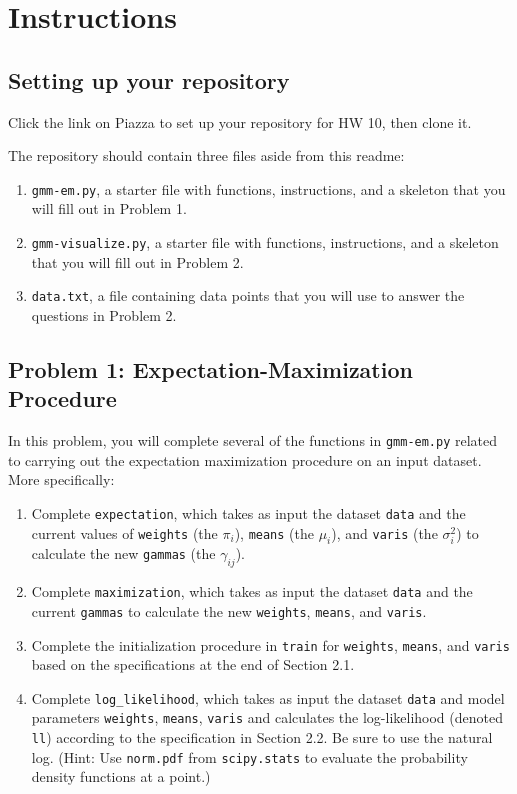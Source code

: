 \documentclass[10pt]{article}
\begin{document}
\section{Instructions}
\renewcommand{\thesubsection}{\thesection.\number\numexpr\value{subsection}-1\relax}

\subsection{Setting up your repository}
Click the link on Piazza to set up your repository for HW 10, then clone it.

The repository should contain three files aside from this readme:

\begin{enumerate}
\item {\tt gmm-em.py}, a starter file with functions, instructions, and a skeleton that you will fill out in Problem 1.
\item {\tt gmm-visualize.py}, a starter file with functions, instructions, and a skeleton that you will fill out in Problem 2.
\item {\tt data.txt}, a file containing data points that you will use to answer the questions in Problem 2.
\end{enumerate}



\subsection{Problem 1: Expectation-Maximization Procedure}
In this problem, you will complete several of the functions in {\tt gmm-em.py} related to carrying out the expectation maximization procedure on an input dataset. More specifically:
\begin{enumerate}
\item Complete {\tt expectation}, which takes as input the dataset {\tt data} and the current values of {\tt weights} (the $\pi_i$), {\tt means} (the $\mu_i$), and {\tt varis} (the $\sigma_i^2$) to calculate the new {\tt gammas} (the $\gamma_{ij}$).

\item Complete {\tt maximization}, which takes as input the dataset {\tt data} and the current {\tt gammas} to calculate the new {\tt weights}, {\tt means}, and {\tt varis}. 

\item Complete the initialization procedure in {\tt train} for {\tt weights}, {\tt means}, and {\tt varis} based on the specifications at the end of Section 2.1.

\item Complete {\tt log\_likelihood}, which takes as input the dataset {\tt data} and model parameters {\tt weights}, {\tt means}, {\tt varis} and calculates the log-likelihood (denoted {\tt ll}) according to the specification in Section 2.2. Be sure to use the natural log. (Hint: Use {\tt norm.pdf} from {\tt scipy.stats} to evaluate the probability density functions at a point.)
\end{enumerate}
\end{document}
